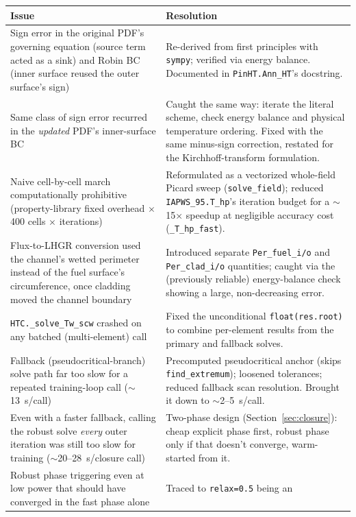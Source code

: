 \documentclass[11pt]{article}
\begin{document}
\begin{longtable}{@{}p{}p{}@{}}
\toprule
\textbf{Issue} & \textbf{Resolution} \\
\midrule
\endhead
Sign error in the original PDF's governing equation (source term acted as
a sink) and Robin BC (inner surface reused the outer surface's sign) &
Re-derived from first principles with \texttt{sympy}; verified via energy
balance. Documented in \texttt{PinHT.Ann\_HT}'s docstring. \\
Same class of sign error recurred in the \emph{updated} PDF's inner-surface
BC & Caught the same way: iterate the literal scheme, check energy balance
and physical temperature ordering. Fixed with the same minus-sign
correction, restated for the Kirchhoff-transform formulation. \\
Naive cell-by-cell march computationally prohibitive (property-library
fixed overhead $\times$ 400 cells $\times$ iterations) & Reformulated as a
vectorized whole-field Picard sweep (\texttt{solve\_field}); reduced
\texttt{IAPWS\_95.T\_hp}'s iteration budget for a $\sim$15$\times$ speedup
at negligible accuracy cost (\texttt{\_T\_hp\_fast}). \\
Flux-to-LHGR conversion used the channel's wetted perimeter instead of the
fuel surface's circumference, once cladding moved the channel boundary &
Introduced separate \texttt{Per\_fuel\_i/o} and \texttt{Per\_clad\_i/o}
quantities; caught via the (previously reliable) energy-balance check
showing a large, non-decreasing error. \\
\texttt{HTC.\_solve\_Tw\_scw} crashed on any batched (multi-element) call &
Fixed the unconditional \texttt{float(res.root)} to combine per-element
results from the primary and fallback solves. \\
Fallback (pseudocritical-branch) solve path far too slow for a repeated
training-loop call ($\sim$13~s/call) & Precomputed pseudocritical anchor
(skips \texttt{find\_extremum}); loosened tolerances; reduced fallback scan
resolution. Brought it down to $\sim$2--5~s/call. \\
Even with a faster fallback, calling the robust solve \emph{every} outer
iteration was still too slow for training ($\sim$20--28~s/closure call) &
Two-phase design (Section~\ref{sec:closure}): cheap explicit phase first,
robust phase only if that doesn't converge, warm-started from it. \\
Robust phase triggering even at low power that should have converged in
the fast phase alone & Traced to \texttt{relax=0.5} being an

\end{longtable}
\end{document}

